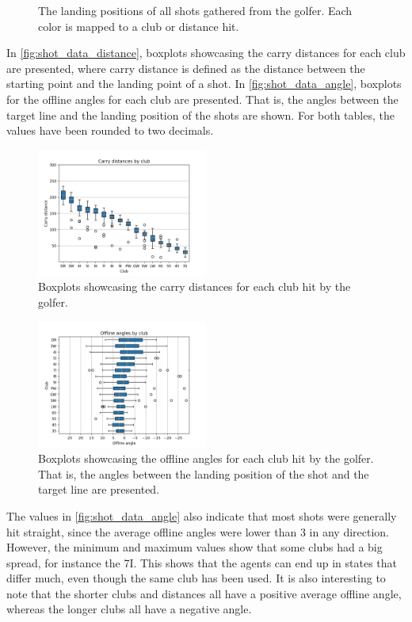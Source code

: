 \documentclass{kththesis}
\begin{document}
\begin{figure}
    \caption{The landing positions of all shots gathered from the golfer. Each color is mapped to a club or distance hit.}
    \label{fig:all_shots}
\end{figure}

In \autoref{fig:shot_data_distance}, boxplots showcasing the carry distances for each club are presented, where carry distance is defined as the distance between the starting point and the landing point of a shot. In \autoref{fig:shot_data_angle}, boxplots for the offline angles for each club are presented. That is, the angles between the target line and the landing position of the shots are shown. For both tables, the values have been rounded to two decimals.

\begin{figure}
    \centering
    \includegraphics[width=0.5\textwidth]{Boxplots/distances.png}
    \caption{Boxplots showcasing the carry distances for each club hit by the golfer.}
    \label{fig:shot_data_distance}
\end{figure}

\begin{figure}
    \centering
    \includegraphics[width=0.5\textwidth]{Boxplots/directions.png}
    \caption{Boxplots showcasing the offline angles for each club hit by the golfer. That is, the angles between the landing position of the shot and the target line are presented.}
    \label{fig:shot_data_angle}
\end{figure}

The values in \autoref{fig:shot_data_angle} also indicate that most shots were generally hit straight, since the average offline angles were lower than 3 in any direction. However, the minimum and maximum values show that some clubs had a big spread, for instance the 7I. This shows that the agents can end up in states that differ much, even though the same club has been used. It is also interesting to note that the shorter clubs and distances all have a positive average offline angle, whereas the longer clubs all have a negative angle.
\end{document}

